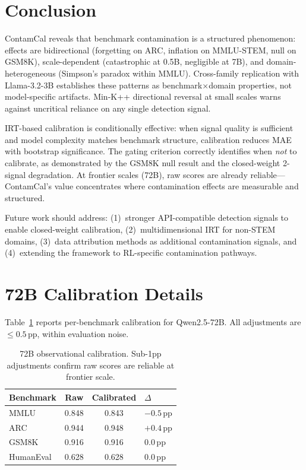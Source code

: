 \documentclass[11pt,a4paper]{article}
\newcommand{\pp}{\,\text{pp}}
\begin{document}
\section{Conclusion}

ContamCal reveals that benchmark contamination is a structured phenomenon: effects are bidirectional (forgetting on ARC, inflation on MMLU-STEM, null on GSM8K), scale-dependent (catastrophic at 0.5B, negligible at 7B), and domain-heterogeneous (Simpson's paradox within MMLU). Cross-family replication with Llama-3.2-3B establishes these patterns as benchmark$\times$domain properties, not model-specific artifacts. Min-K++ directional reversal at small scales warns against uncritical reliance on any single detection signal.

IRT-based calibration is conditionally effective: when signal quality is sufficient and model complexity matches benchmark structure, calibration reduces MAE with bootstrap significance. The gating criterion correctly identifies when \emph{not} to calibrate, as demonstrated by the GSM8K null result and the closed-weight 2-signal degradation. At frontier scales (72B), raw scores are already reliable---ContamCal's value concentrates where contamination effects are measurable and structured.

Future work should address: (1)~stronger API-compatible detection signals to enable closed-weight calibration, (2)~multidimensional IRT for non-STEM domains, (3)~data attribution methods \cite{pruthi2020estimating,park2023trak} as additional contamination signals, and (4)~extending the framework to RL-specific contamination pathways.

\appendix
\section{72B Calibration Details}

Table~\ref{tab:72b_cal} reports per-benchmark calibration for Qwen2.5-72B. All adjustments are $\leq 0.5\pp$, within evaluation noise.

\begin{table}[h]
\centering
\small
\caption{72B observational calibration. Sub-1pp adjustments confirm raw scores are reliable at frontier scale.}
\label{tab:72b_cal}
\begin{tabular}{lccl}
\toprule
\textbf{Benchmark} & \textbf{Raw} & \textbf{Calibrated} & \textbf{$\Delta$} \\
\midrule
MMLU & 0.848 & 0.843 & $-0.5\pp$ \\
ARC & 0.944 & 0.948 & $+0.4\pp$ \\
GSM8K & 0.916 & 0.916 & $0.0\pp$ \\
HumanEval & 0.628 & 0.628 & $0.0\pp$ \\
\bottomrule
\end{tabular}
\end{table}
\end{document}
